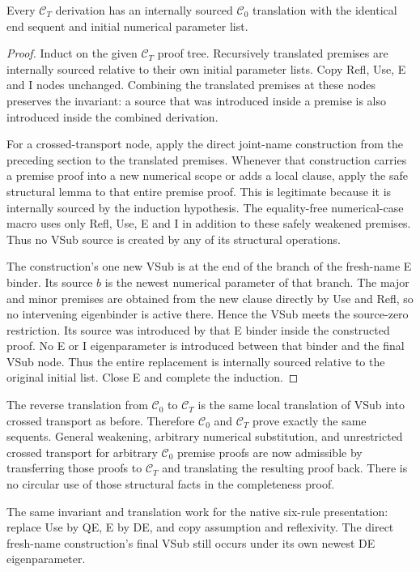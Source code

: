\begin{theorem}
Every $\mathcal C_T$ derivation has an internally sourced
$\mathcal C_0$ translation with the identical end sequent and initial
numerical parameter list.
\end{theorem}
\begin{proof}
Induct on the given $\mathcal C_T$ proof tree. Recursively translated
premises are internally sourced relative to their own initial
parameter lists. Copy Refl, Use, E and I nodes unchanged. Combining
the translated premises at these nodes preserves the invariant:
a source that was introduced inside a premise is also introduced
inside the combined derivation.

For a crossed-transport node, apply the direct joint-name construction
from the preceding section to the translated premises. Whenever that
construction carries a premise proof into a new numerical scope or
adds a local clause, apply the safe structural lemma to that entire
premise proof. This is legitimate because it is internally sourced by
the induction hypothesis. The equality-free numerical-case macro
uses only Refl, Use, E and I in addition to these safely weakened
premises. Thus no VSub source is created by any of its structural
operations.

The construction's one new VSub is at the end of the branch of the
fresh-name E binder. Its source $b$ is the newest numerical parameter
of that branch. The major and minor premises are obtained from the
new clause directly by Use and Refl, so no intervening eigenbinder
is active there. Hence the VSub meets the source-zero restriction.
Its source was introduced by that E binder inside the constructed
proof. No E or I eigenparameter is introduced between that binder
and the final VSub node. Thus the entire replacement is internally
sourced relative to the original initial list. Close E and complete the induction.
\end{proof}

The reverse translation from $\mathcal C_0$ to $\mathcal C_T$ is the
same local translation of VSub into crossed transport as before.
Therefore $\mathcal C_0$ and $\mathcal C_T$ prove exactly the same
sequents. General weakening, arbitrary numerical substitution, and
unrestricted crossed transport for arbitrary $\mathcal C_0$ premise
proofs are now admissible by transferring those proofs to
$\mathcal C_T$ and translating the resulting proof back. There is no
circular use of those structural facts in the completeness proof.

The same invariant and translation work for the native six-rule
presentation: replace Use by QE, E by DE, and copy assumption and
reflexivity. The direct fresh-name construction's final VSub still
occurs under its own newest DE eigenparameter.
